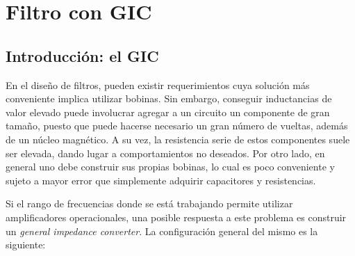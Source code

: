 \documentclass[../../tc_tp3_main.tex]{subfiles}
\begin{document}
\chapter{Filtro con GIC}

\section{Introducci\'on: el GIC}
\label{section:1-intro}

En el dise\~no de filtros, pueden existir requerimientos cuya soluci\'on m\'as conveniente implica utilizar bobinas. Sin embargo, conseguir inductancias de valor elevado puede involucrar agregar a un circuito un componente de gran tama\~no, puesto que puede hacerse necesario un gran n\'umero de vueltas, adem\'as de un n\'ucleo magn\'etico. A su vez, la resistencia serie de estos componentes suele ser elevada, dando lugar a comportamientos no deseados. Por otro lado, en general uno debe construir sus propias bobinas, lo cual es poco conveniente y sujeto a mayor error que simplemente adquirir capacitores y resistencias. \par 

Si el rango de frecuencias donde se est\'a trabajando permite utilizar amplificadores operacionales, una posible respuesta a este problema es construir un \textit{general impedance converter}. La configuraci\'on general del mismo es la siguiente:
\end{document}
